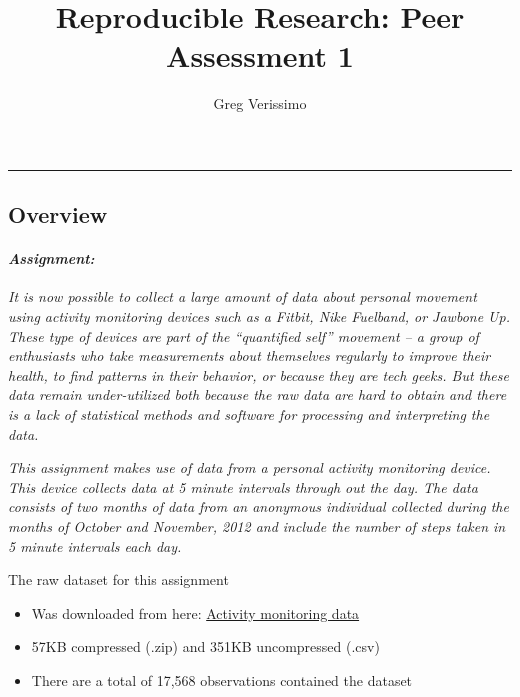 \documentclass[]{article}
\title{Reproducible Research: Peer Assessment 1}
\author{Greg Verissimo}
\date{}
\providecommand{\tightlist}{%
  \setlength{\itemsep}{0pt}\setlength{\parskip}{0pt}}
\let\oldparagraph\paragraph
\renewcommand{\paragraph}[1]{\oldparagraph{#1}\mbox{}}
\begin{document}
\maketitle

\begin{center}\rule{0.5\linewidth}{\linethickness}\end{center}

\hypertarget{overview}{%
\subsection{Overview}\label{overview}}

\hypertarget{assignment}{%
\paragraph{\texorpdfstring{\emph{Assignment:}}{Assignment:}}\label{assignment}}

\emph{It is now possible to collect a large amount of data about
personal movement using activity monitoring devices such as a Fitbit,
Nike Fuelband, or Jawbone Up. These type of devices are part of the
``quantified self'' movement -- a group of enthusiasts who take
measurements about themselves regularly to improve their health, to find
patterns in their behavior, or because they are tech geeks. But these
data remain under-utilized both because the raw data are hard to obtain
and there is a lack of statistical methods and software for processing
and interpreting the data.}

\emph{This assignment makes use of data from a personal activity
monitoring device. This device collects data at 5 minute intervals
through out the day. The data consists of two months of data from an
anonymous individual collected during the months of October and
November, 2012 and include the number of steps taken in 5 minute
intervals each day.}

The raw dataset for this assignment

\begin{itemize}
\tightlist
\item
  Was downloaded from here:
  \href{https://d396qusza40orc.cloudfront.net/repdata\%2Fdata\%2Factivity.zip}{Activity
  monitoring data}
\item
  57KB compressed (.zip) and 351KB uncompressed (.csv)
\item
  There are a total of 17,568 observations contained the dataset
\end{itemize}
\end{document}
